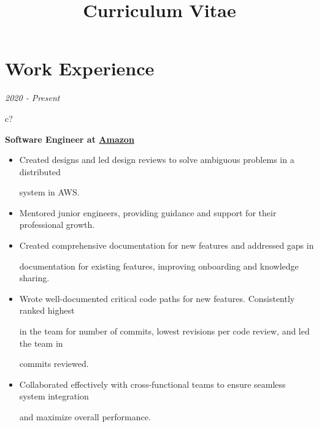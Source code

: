 \documentclass[12pt,a4paper,sans]{moderncv} %
\title{Curriculum Vitae}
\begin{document}
\begin{comment}
\hspace{2 mm}
\textit{2018}
\hspace{2 mm}
\begin{tabular}{c?}
 \\
\end{tabular}
 \hspace{2 mm}
 \textbf{B.S. in Computer Science}, minor in Economics, Allegheny College - cumulative GPA: 3.80
\end{comment}

\makecvtitle %
\vspace{-16 mm}
\section{Work Experience}


\textit{2020 - Present}
\hspace{1 mm}
\begin{tabular}{c?}
 \\
\end{tabular}
\hspace{1 mm}
\textbf{Software Engineer at \href{https://www.amazon.com/}{Amazon}}

\vspace{-1 mm}
\begin{itemize}
\addtolength{\itemindent}{31.7 mm}
\vspace{2 pt}
\item{Created designs and led design reviews to solve ambiguous problems in a distributed 

\hspace{30.5 mm} system in AWS.}
\item{Mentored junior engineers, providing guidance and support for their professional growth.}
\item{Created comprehensive documentation for new features and addressed gaps in 

\hspace{30.5 mm} documentation for existing features, improving onboarding and knowledge sharing.}
\item{Wrote well-documented critical code paths for new features. Consistently ranked highest 

\hspace{30.5 mm} in the team for number of commits, lowest revisions per code review, and led the team in 

\hspace{30.5 mm} commits reviewed.}
\item{Collaborated effectively with cross-functional teams to ensure seamless system integration 

\hspace{30.5 mm} and maximize overall performance.}
\end{itemize}
\end{document}
